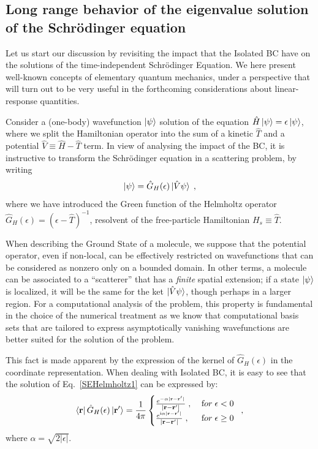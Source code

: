 \documentclass[reprint,aps,prb]{revtex4-1}
\renewcommand{\r}{{\bf r}}
\newcommand{\eps}{\epsilon}
\newcommand{\ii}{\mathrm{i}}
\newcommand{\be}{\begin{equation}}
\newcommand{\ee}{\end{equation}}
\newcommand{\lb}{\label}
\newcommand{\op}[1]{\hat {#1}}
\begin{document}
\subsection{Long range behavior of the eigenvalue solution of the Schr\"odinger equation}
\label{SEopenSystem}

Let us start our discussion by revisiting the impact that the Isolated BC have on the 
solutions of the time-independent Schr\"odinger Equation.
We here present well-known concepts of elementary quantum mechanics, under a perspective that
will turn out to be very useful in the forthcoming considerations about linear-response quantities.

Consider a (one-body) wavefunction $\ket{\psi}$ solution of the equation
$\op H\ket{\psi}=\eps\ket{\psi}$, where we split the Hamiltonian operator into the sum of
a kinetic $\op T$ and a potential $\op V \equiv \op H - \op T$ term.
In view of analysing the impact of the BC, it is instructive to transform 
the Schr\"odinger equation in a scattering problem, by writing
\be\lb{SEHelmholtz1}
\ket{\psi} = \op G_H(\eps)\ket{\op V\psi}\;,
\ee
where we have introduced the Green function of the Helmholtz operator $\op G_H(\eps) = (\eps-\op T)^{-1}$,
resolvent of the free-particle Hamiltonian $H_s \equiv \op T$.

When describing the Ground State of a molecule, we suppose that the potential operator, even if non-local,
can be effectively restricted on wavefunctions that can be considered as nonzero only on a
bounded domain. In other terms, a molecule can be associated to a ``scatterer'' that has a \emph{finite} 
spatial extension; if a state $\ket{\psi}$ is localized, it will be the same for the ket $\ket{\op V \psi}$, though 
perhaps in a larger region.
For a computational analysis of the problem, this property is fundamental in the choice of the numerical treatment as we know that
computational basis sets 
that are tailored to express asymptotically vanishing wavefunctions are better suited for the solution of the problem.

This fact is made apparent by the expression of 
the kernel of $\op G_H(\eps)$ in the coordinate representation. 
When dealing with Isolated BC, it is easy to see that the solution of Eq.~\eqref{SEHelmholtz1}
can be expressed by:
\be\lb{HelmholtzKernelDef1}
\bra{\r} \op G_H(\eps) \ket{\r'} = \frac{1}{4\pi} \begin{cases}
\frac{e^{-\alpha|\r - \r' |}}{|\r- \r' |} \;,\; & {\textrm for}\; \eps  < 0\; \\ 
\frac{e^{\ii \alpha |\r-\r' |}}{|\r-\r' |} \;, & {\textrm for} \; \eps \geq 0
\end{cases} \;,
\ee
where $\alpha = \sqrt{2|\eps|}$. 
\end{document}

